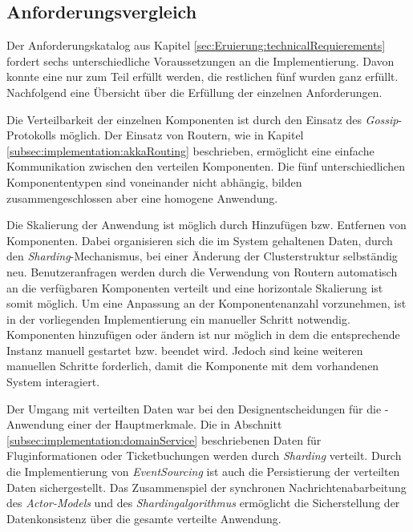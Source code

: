 \subsection{Anforderungsvergleich}
Der Anforderungskatalog aus Kapitel \ref{sec:Eruierung:technicalRequierements} fordert sechs unterschiedliche Voraussetzungen an die Implementierung. Davon konnte eine nur zum Teil erfüllt werden, die restlichen fünf wurden ganz erfüllt. \\
Nachfolgend eine Übersicht über die Erfüllung der einzelnen Anforderungen.
\begin{enumerate}
    Die Verteilbarkeit der einzelnen Komponenten ist durch den Einsatz des \textit{Gossip}-Protokolls möglich. Der Einsatz von Routern, wie in Kapitel \ref{subsec:implementation:akkaRouting} beschrieben, ermöglicht eine einfache Kommunikation  zwischen den verteilen Komponenten. Die fünf unterschiedlichen Komponententypen sind voneinander nicht abhängig, bilden zusammengeschlossen aber eine homogene Anwendung.

    Die Skalierung der Anwendung ist möglich durch Hinzufügen bzw. Entfernen von Komponenten. Dabei organisieren sich die im System gehaltenen Daten, durch den \textit{Sharding}-Mechanismus, bei einer Änderung der Clusterstruktur selbständig neu. Benutzeranfragen werden durch die Verwendung von Routern automatisch an die verfügbaren Komponenten verteilt und eine horizontale Skalierung ist somit möglich. Um eine Anpassung an der Komponentenanzahl vorzunehmen, ist  in der vorliegenden Implementierung ein manueller Schritt notwendig. Komponenten hinzufügen oder ändern ist nur möglich in dem die entsprechende Instanz manuell gestartet bzw. beendet wird. Jedoch sind keine weiteren manuellen Schritte forderlich, damit die Komponente mit dem vorhandenen System interagiert. 

    Der Umgang mit verteilten Daten war bei den Designentscheidungen für die -Anwendung einer der Hauptmerkmale. Die in Abschnitt \ref{subsec:implementation:domainService} beschriebenen Daten für Fluginformationen oder Ticketbuchungen werden durch \textit{Sharding} verteilt. Durch die Implementierung von \textit{EventSourcing} ist auch die Persistierung der verteilten Daten sichergestellt. Das Zusammenspiel der synchronen Nachrichtenabarbeitung des \textit{Actor-Models} und des \textit{Shardingalgorithmus} ermöglicht die Sicherstellung der Datenkonsistenz über die gesamte verteilte Anwendung.
   

\end{enumerate}
